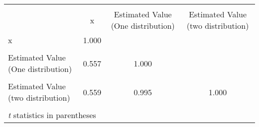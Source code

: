 \begin{tabular}{l*{3}{c}}
\hline\hline
                    &\multicolumn{3}{c}{}                  \\
                    &           x&Estimated Value (One distribution)&Estimated Value (two distribution)\\
\hline
x                   &       1.000&            &            \\
                    &            &            &            \\
[1em]
Estimated Value (One distribution)&       0.557&       1.000&            \\
                    &            &            &            \\
[1em]
Estimated Value (two distribution)&       0.559&       0.995&       1.000\\
                    &            &            &            \\
\hline\hline
\multicolumn{4}{l}{\footnotesize \textit{t} statistics in parentheses}\\
\end{tabular}
